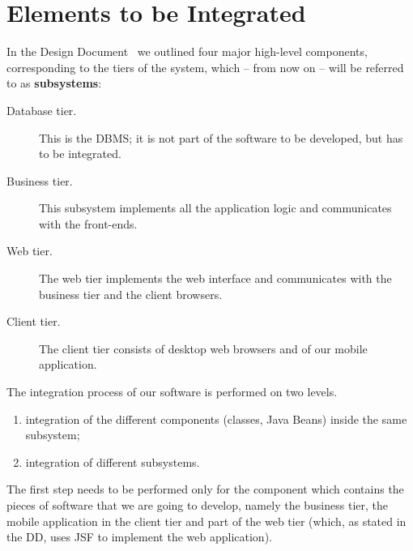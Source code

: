 \section{Elements to be Integrated}
\label{sec:elements}

In the Design Document~\cite[p.~6]{mytaxi-dd} we outlined four major high-level components, corresponding to the tiers of the system, which – from now on – will be referred to as \textbf{subsystems}:
\begin{description}
    \item[Database tier.] This is the DBMS; it is not part of the software to be developed, but has to be integrated.
    \item[Business tier.] This subsystem implements all the application logic and communicates with the front-ends.
    \item[Web tier.] The web tier implements the web interface and communicates with the business tier and the client browsers.
    \item[Client tier.] The client tier consists of desktop web browsers and of our mobile application.
\end{description}

The integration process of our software is performed on two levels.
\begin{enumerate}
    \item integration of the different components (classes, Java Beans) inside the same subsystem;
    \item integration of different subsystems.
\end{enumerate}

The first step needs to be performed only for the component which contains the pieces of software that we are going to develop, namely the business tier, the mobile application in the client tier and part of the web tier (which, as stated in the DD, uses JSF to implement the web application).
